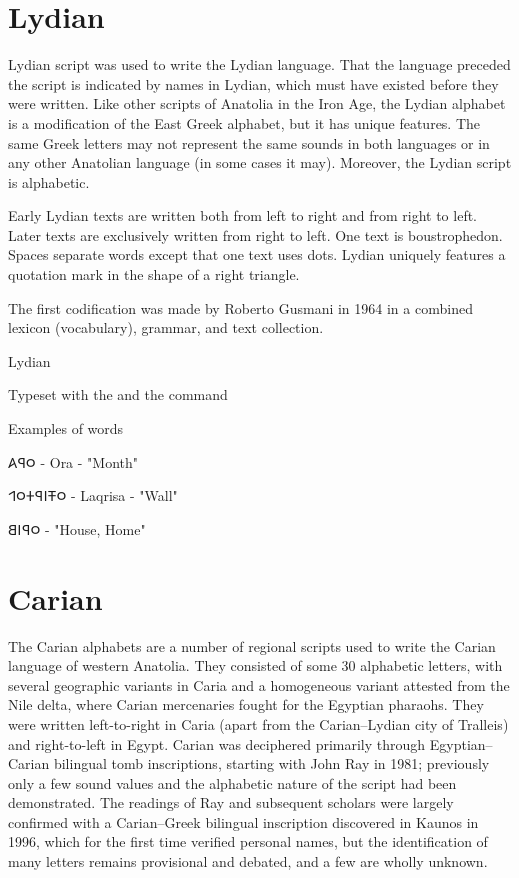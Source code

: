 

\section{Lydian}
 Lydian script was used to write the Lydian language. That the language preceded the script is indicated by names in Lydian, which must have existed before they were written. Like other scripts of Anatolia in the Iron Age, the Lydian alphabet is a modification of the East Greek alphabet, but it has unique features. The same Greek letters may not represent the same sounds in both languages or in any other Anatolian language (in some cases it may). Moreover, the Lydian script is alphabetic.



Early Lydian texts are written both from left to right and from right to left. Later texts are exclusively written from right to left. One text is boustrophedon. Spaces separate words except that one text uses dots. Lydian uniquely features a quotation mark in the shape of a right triangle.

The first codification was made by Roberto Gusmani in 1964 in a combined lexicon (vocabulary), grammar, and text collection.

\begin{scriptexample}[]{Lydian}

\medskip

Typeset with the  and the command \cmd{\lydian}
\end{scriptexample}

Examples of words

\bgroup\lydian
𐤬𐤭𐤠  - Ora - "Month"

𐤬𐤳𐤦𐤭𐤲𐤬𐤩  - Laqrisa - "Wall"

𐤬𐤭𐤦𐤡  - "House, Home"

\egroup






\section{Carian}

The Carian alphabets are a number of regional scripts used to write the Carian language of western Anatolia. They consisted of some 30 alphabetic letters, with several geographic variants in Caria and a homogeneous variant attested from the Nile delta, where Carian mercenaries fought for the Egyptian pharaohs. They were written left-to-right in Caria (apart from the Carian–Lydian city of Tralleis) and right-to-left in Egypt. Carian was deciphered primarily through Egyptian–Carian bilingual tomb inscriptions, starting with John Ray in 1981; previously only a few sound values and the alphabetic nature of the script had been demonstrated. The readings of Ray and subsequent scholars were largely confirmed with a Carian–Greek bilingual inscription discovered in Kaunos in 1996, which for the first time verified personal names, but the identification of many letters remains provisional and debated, and a few are wholly unknown.

